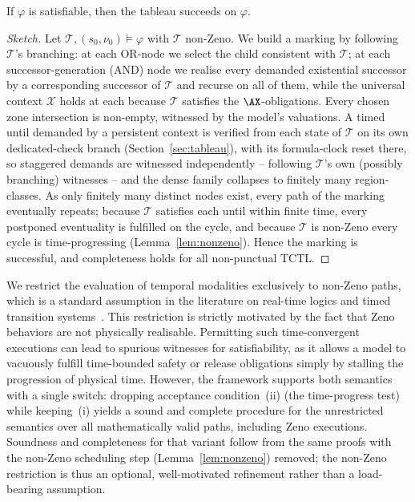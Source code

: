 \begin{theorem}[Completeness]\label{thm:completeness}
If $\varphi$ is satisfiable, then the tableau succeeds on $\varphi$.
\end{theorem}


\begin{proof}[Sketch]
Let $\mathcal{T},(s_0,\nu_0)\models\varphi$ with $\mathcal{T}$ non-Zeno. We build a marking by following $\mathcal{T}$'s branching: at each OR-node we select the child consistent with $\mathcal{T}$; at each successor-generation (AND) node we realise {every} demanded existential successor by a corresponding successor of $\mathcal{T}$ and recurse on all of them, while the universal context $\mathcal{X}$ holds at each because $\mathcal{T}$ satisfies the $\AX$-obligations. Every chosen zone intersection is non-empty, witnessed by the model's valuations. A timed until demanded by a persistent context is verified from each state of $\mathcal{T}$ on its own dedicated-check branch (Section~\ref{sec:tableau}), with its formula-clock reset there, so staggered demands are witnessed {independently} -- following $\mathcal{T}$'s own (possibly branching) witnesses -- and the dense family collapses to finitely many region-classes. As only finitely many distinct nodes exist, every path of the marking eventually repeats; because $\mathcal{T}$ satisfies each until within finite time, every postponed eventuality is fulfilled on the cycle, and because $\mathcal{T}$ is non-Zeno every cycle is time-progressing (Lemma~\ref{lem:nonzeno}). Hence the marking is successful, and completeness holds for {all} non-punctual TCTL.
\end{proof}



\begin{remark}
  We restrict the evaluation of temporal modalities exclusively to non-Zeno paths, which is a standard assumption in the literature on real-time logics and timed transition systems~\cite{AlurDill1994,BouyerHR2008}. This restriction is strictly motivated by the fact that Zeno behaviors are not physically realisable. Permitting such time-convergent executions can lead to spurious witnesses for satisfiability, as it allows a model to vacuously fulfill time-bounded safety or release obligations simply by stalling the progression of physical time. However, the framework supports {both} semantics with a single switch: dropping acceptance condition~(ii) (the time-progress test) while keeping~(i) yields a sound and complete procedure for the unrestricted semantics over all mathematically valid paths, including Zeno executions. Soundness and completeness for that variant follow from the same proofs with the non-Zeno scheduling step (Lemma~\ref{lem:nonzeno}) removed; the non-Zeno restriction is thus an optional, well-motivated refinement rather than a load-bearing assumption.
\end{remark}







